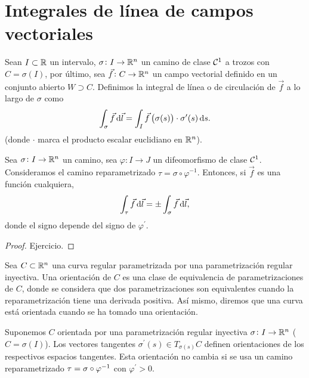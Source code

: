 \section{Integrales de línea de campos vectoriales}

\begin{defi}
    Sean $I \subset \mathbb{R}$ un intervalo, $\sigma \colon I \to \mathbb{R}^n$ un camino de clase $\mathcal{C}^1$ a trozos con $C = \sigma(I)$, por último,
    sea $\vec{f} \colon C \to \mathbb{R}^n$ un campo vectorial definido en un conjunto abierto $W \supset C$. Definimos la integral de línea o de circulación
    de $\vec{f}$ a lo largo de $\sigma$ como
    \[
        \int_\sigma \vec{f} \dif \vec{l} = \int_I \vec{f} \left( \sigma(s) \right) \cdot \sigma^\prime(s) \dif s.
    \]
    (donde $\cdot$ marca el producto escalar euclidiano en $\mathbb{R}^n$).
\end{defi}

\begin{prop}
    Sea $\sigma  \colon I \to \mathbb{R}^n$ un camino, sea $\varphi \colon I \to J$ un difeomorfismo de clase $\mathcal{C}^1$. Consideramos
    el camino reparametrizado $\tau = \sigma \circ \varphi^{-1}$. Entonces, si $\vec{f}$ es una función cualquiera,
    \[
        \int_\tau \vec{f} \dif \vec{l} = \pm \int_\sigma \vec{f} \dif \vec{l},
    \]
    donde el signo depende del signo de $\varphi^\prime$.
\end{prop}

\begin{proof}
    Ejercicio.
\end{proof}

\begin{defi}
    Sea $C \subset \mathbb{R}^n$ una curva regular parametrizada por una parametrización regular inyectiva. Una orientación de $C$ es una clase
    de equivalencia de parametrizaciones de $C$, donde se considera que dos parametrizaciones son equivalentes cuando la reparametrización
    tiene una derivada positiva. Así mismo, diremos que una curva está orientada cuando se ha tomado una orientación.
\end{defi}

\begin{obs}
    Suponemos $C$ orientada por una parametrización regular inyectiva $\sigma \colon I \to \mathbb{R}^n$ ($C = \sigma(I)$). Los vectores tangentes
    $\sigma^\prime(s) \in T_{\sigma(s)}C$ definen orientaciones de los respectivos espacios tangentes. Esta orientación no cambia si se usa
    un camino reparametrizado $\tau = \sigma \circ \varphi^{-1}$ con $\varphi^\prime > 0$.
\end{obs}

